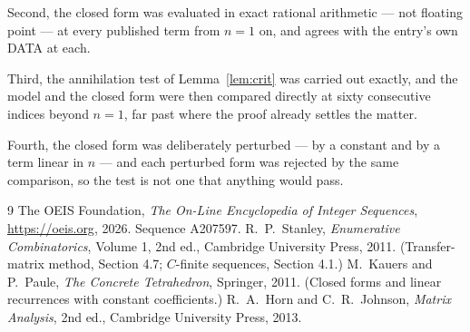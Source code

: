 \documentclass[11pt,a4paper]{article}
\theoremstyle{plain}
\theoremstyle{definition}
\begin{document}
Second, the closed form was evaluated in exact rational arithmetic --- not floating point ---
at every published term from $n=1$ on, and agrees with the entry's own DATA at each.

Third, the annihilation test of Lemma~\ref{lem:crit} was carried out exactly, and the model
and the closed form were then compared directly at sixty consecutive indices beyond
$n=1$, far past where the proof already settles the matter.

Fourth, the closed form was deliberately perturbed --- by a constant and by a term linear in
$n$ --- and each perturbed form was rejected by the same comparison, so the test is not one
that anything would pass.

\begin{thebibliography}{9}
 The OEIS Foundation, \emph{The On-Line Encyclopedia of Integer
Sequences}, \url{https://oeis.org}, 2026. Sequence A207597.
 R.~P.~Stanley, \emph{Enumerative Combinatorics}, Volume 1, 2nd ed.,
Cambridge University Press, 2011. (Transfer-matrix method, Section 4.7; $C$-finite sequences,
Section 4.1.)
 M.~Kauers and P.~Paule, \emph{The Concrete Tetrahedron}, Springer, 2011.
(Closed forms and linear recurrences with constant coefficients.)
 R.~A.~Horn and C.~R.~Johnson, \emph{Matrix Analysis}, 2nd ed., Cambridge
University Press, 2013.
\end{thebibliography}
\end{document}
